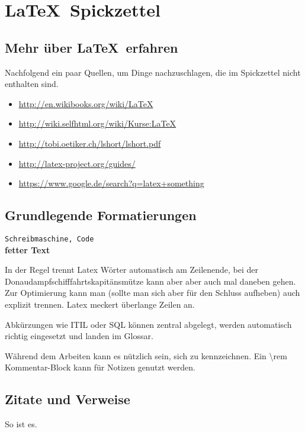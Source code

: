 \ifincludespickzettel

\section{\LaTeX\ Spickzettel}
\label{sec:spickzettel}
\subsection{Mehr über \LaTeX\ erfahren}

Nachfolgend ein paar Quellen, um Dinge nachzuschlagen, die im Spickzettel nicht enthalten sind.

\begin{itemize}
	\item \url{http://en.wikibooks.org/wiki/LaTeX}
	\item \url{http://wiki.selfhtml.org/wiki/Kurse:LaTeX}	
	\item \url{http://tobi.oetiker.ch/lshort/lshort.pdf}
	\item \url{http://latex-project.org/guides/}
	\item \url{https://www.google.de/search?q=latex+something}
\end{itemize}

\subsection{Grundlegende Formatierungen}

\texttt{Schreibmaschine, Code}\\
\textbf{fetter Text}

In der Regel trennt Latex Wörter automatisch am Zeilenende, bei der Donau\-dampf\-schiff\-fahrtskapitäns\-mütze kann aber aber auch mal daneben gehen. Zur Optimierung kann man (sollte man sich aber für den Schluss aufheben) auch explizit trennen. Latex meckert überlange Zeilen an.

Abkürzungen wie \ac{ITIL} oder \acs{SQL} können zentral abgelegt, werden automatisch richtig eingesetzt und landen im Glossar.

Während dem Arbeiten kann es nützlich sein, sich  zu kennzeichnen. 
Ein \textbackslash rem Kommentar-Block kann für Notizen genutzt werden.

\subsection{Zitate und Verweise}
So ist es. \cite{hug_algoverbessern}

